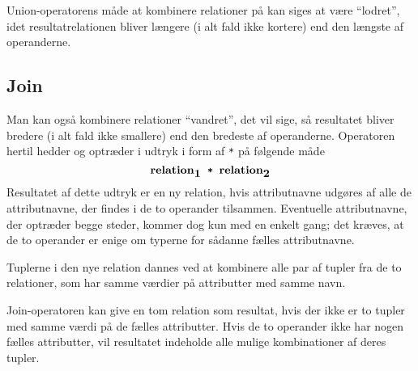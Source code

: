 \newpage
Union-operatorens m\aa{}de at kombinere relationer
p\aa{} kan siges at v\ae{}re ``lodret'', idet resultatrelationen bliver
l\ae{}ngere (i alt fald ikke kortere) end den l\ae{}ngste af operanderne.

\subsection{Join}
Man kan ogs\aa{} kombinere relationer ``vandret'', det vil sige, s\aa{}
resultatet bliver bredere (i alt fald ikke smallere) end den
bredeste af operanderne. Operatoren hertil hedder {\em {}\/} og
optr\ae{}der i udtryk i form af \verb"*" p\aa{} f\o{}lgende m\aa{}de
$$ \mbox{\bf relation}_{\mbox{\bf 1}}\mbox{\tt ~*~}\mbox{\bf relation}_{\mbox{\bf 2}}$$
Resultatet af dette udtryk er en ny relation, hvis attributnavne udg\o{}res
af alle de attributnavne, der findes i de to operander tilsammen.
Eventuelle attributnavne, der optr\ae{}der begge steder, kommer dog kun med
en enkelt gang; det kr\ae{}ves, at de to operander er enige om
typerne for s\aa{}danne f\ae{}lles attributnavne.

Tuplerne i den nye relation dannes ved at kombinere alle par af tupler fra
de to relationer, som har samme v\ae{}rdier p\aa{} attributter med samme navn.

Join-operatoren kan give en tom relation som resultat, hvis
der ikke er to tupler med samme v\ae{}rdi p\aa{} de f\ae{}lles attributter.
Hvis de to operander ikke har nogen f\ae{}lles
attributter, vil resultatet indeholde alle mulige kombinationer
af deres tupler.

